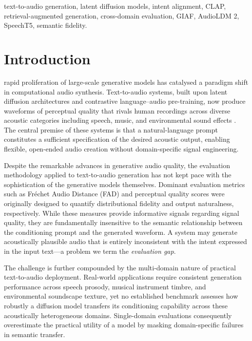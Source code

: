 \documentclass[journal]{IEEEtran}
\begin{document}
\begin{IEEEkeywords}
text-to-audio generation, latent diffusion models, intent alignment,
CLAP, retrieval-augmented generation, cross-domain evaluation, GIAF,
AudioLDM 2, SpeechT5, semantic fidelity.
\end{IEEEkeywords}

\section{Introduction}
\label{sec:intro}

 rapid proliferation of large-scale generative
models has catalysed a paradigm shift in computational audio synthesis.
Text-to-audio systems, built upon latent diffusion architectures and
contrastive language--audio pre-training, now produce waveforms of
perceptual quality that rivals human recordings across diverse acoustic
categories including speech, music, and environmental sound effects
\cite{liu2023audioldm, kreuk2022audiogen, huang2023makeanaudio}.
The central premise of these systems is that a natural-language prompt
constitutes a sufficient specification of the desired acoustic output,
enabling flexible, open-ended audio creation without domain-specific
signal engineering.


Despite the remarkable
advances in generative audio quality, the evaluation methodology
applied to text-to-audio generation has not kept pace with the
sophistication of the generative models themselves. Dominant evaluation
metrics such as Fr{\'e}chet Audio Distance (FAD) and perceptual quality
scores were originally designed to quantify distributional fidelity and
output naturalness, respectively. While these measures provide
informative signals regarding signal quality, they are fundamentally
insensitive to the semantic relationship between the conditioning prompt
and the generated waveform. A system may generate acoustically plausible
audio that is entirely inconsistent with the intent expressed in the
input text---a problem we term the \textit{evaluation gap}.

The challenge is further compounded by the multi-domain nature of
practical text-to-audio deployment. Real-world applications require
consistent generation performance across speech prosody, musical
instrument timbre, and environmental soundscape texture, yet no
established benchmark assesses how robustly a diffusion model transfers
its conditioning capability across these acoustically heterogeneous
domains. Single-domain evaluations consequently overestimate the
practical utility of a model by masking domain-specific failures in
semantic transfer.
\end{document}
